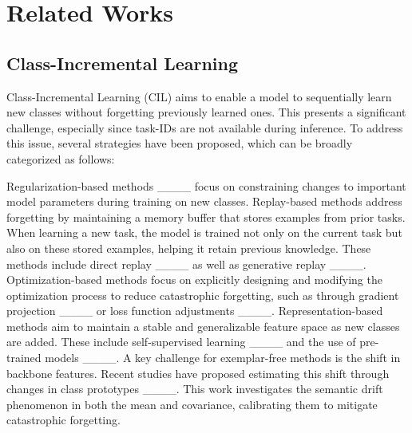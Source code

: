 \section{Related Works}
\subsection{Class-Incremental Learning}


Class-Incremental Learning (CIL) aims to enable a model to sequentially learn new classes without forgetting previously learned ones. This presents a significant challenge, especially since task-IDs are not available during inference. To address this issue, several strategies have been proposed, which can be broadly categorized as follows:

Regularization-based methods ____ focus on constraining changes to important model parameters during training on new classes. Replay-based methods address forgetting by maintaining a memory buffer that stores examples from prior tasks. When learning a new task, the model is trained not only on the current task but also on these stored examples, helping it retain previous knowledge. These methods include direct replay ____ as well as generative replay ____. Optimization-based methods focus on explicitly designing and modifying the optimization process to reduce catastrophic forgetting, such as through gradient projection ____ or loss function adjustments ____. Representation-based methods aim to maintain a stable and generalizable feature space as new classes are added. These include self-supervised learning ____ and the use of pre-trained models ____. A key challenge for exemplar-free methods is the shift in backbone features. Recent studies have proposed estimating this shift through changes in class prototypes ____. This work investigates the semantic drift phenomenon in both the mean and covariance, calibrating them to mitigate catastrophic forgetting.



